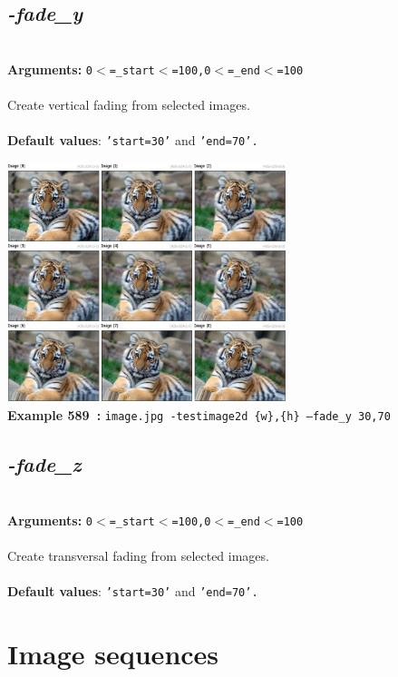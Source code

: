 \documentclass[a4paper,11pt,twoside]{book}
\begin{document}
\subsection{\emph{-fade\_y} }\vspace*{-0.5em}
~\\\textbf{Arguments: } 
{\small \texttt{0$<$=\_start$<$=100,0$<$=\_end$<$=100}}\\~\\
Create vertical fading from selected images.
~\\~\\\textbf{Default values}: {\small \texttt{'start=30'} and \texttt{'end=70'.}}
\begin{center}\includegraphics[keepaspectratio=true,height=7cm,width=\textwidth]{img/gmic_def589.jpg}\\
{\footnotesize \textbf{Example 589~:} \texttt{image.jpg -testimage2d \{w\},\{h\} --fade\_y 30,70}}
\end{center}

\subsection{\emph{-fade\_z} }\vspace*{-0.5em}
~\\\textbf{Arguments: } 
{\small \texttt{0$<$=\_start$<$=100,0$<$=\_end$<$=100}}\\~\\
Create transversal fading from selected images.
~\\~\\\textbf{Default values}: {\small \texttt{'start=30'} and \texttt{'end=70'.}}

\section{Image sequences}
\end{document}
